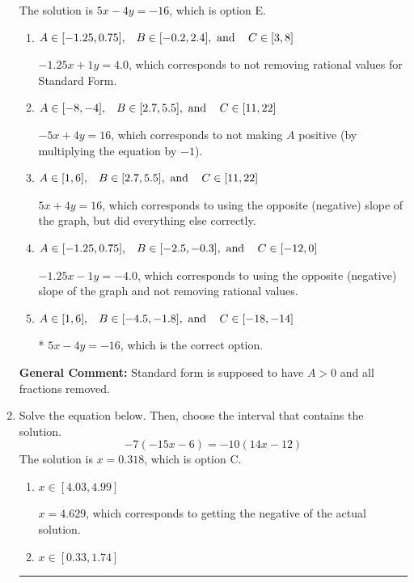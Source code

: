 \documentclass{extbook}[14pt]
\newcommand{\litem}[1]{\item #1

\rule{\textwidth}{0.4pt}}
\begin{document}
\begin{enumerate}
{The solution is \( 5x - 4y = -16 \), which is option E.\begin{enumerate}[label=\Alph*.]
\item \( A \in [-1.25, 0.75], \hspace{3mm} B \in [-0.2, 2.4], \text{ and } \hspace{3mm} C \in [3, 8] \)

 $-1.25x + 1y = 4.0$, which corresponds to not removing rational values for Standard Form.
\item \( A \in [-8, -4], \hspace{3mm} B \in [2.7, 5.5], \text{ and } \hspace{3mm} C \in [11, 22] \)

 $-5x + 4y = 16$, which corresponds to not making $A$ positive (by multiplying the equation by $-1$).
\item \( A \in [1, 6], \hspace{3mm} B \in [2.7, 5.5], \text{ and } \hspace{3mm} C \in [11, 22] \)

 $5x + 4y = 16$, which corresponds to using the opposite (negative) slope of the graph, but did everything else correctly.
\item \( A \in [-1.25, 0.75], \hspace{3mm} B \in [-2.5, -0.3], \text{ and } \hspace{3mm} C \in [-12, 0] \)

 $-1.25x - 1y = -4.0$, which corresponds to using the opposite (negative) slope of the graph and not removing rational values.
\item \( A \in [1, 6], \hspace{3mm} B \in [-4.5, -1.8], \text{ and } \hspace{3mm} C \in [-18, -14] \)

* $5x - 4y = -16$, which is the correct option.
\end{enumerate}

\textbf{General Comment:} Standard form is supposed to have $A > 0$ and all fractions removed.
}
\litem{
Solve the equation below. Then, choose the interval that contains the solution.
\[ -7(-15x -6) = -10(14x -12) \]The solution is \( x = 0.318 \), which is option C.\begin{enumerate}[label=\Alph*.]
\item \( x \in [4.03, 4.99] \)

$x = 4.629$, which corresponds to getting the negative of the actual solution.
\item \( x \in [0.33, 1.74] \)


\end{enumerate}}
\end{enumerate}
\end{document}
